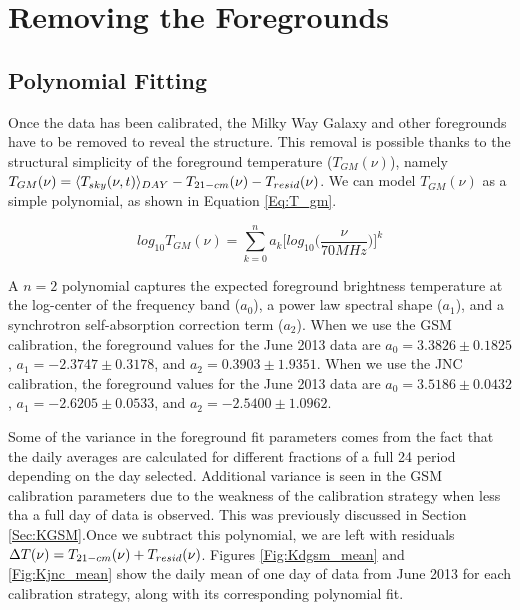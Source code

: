\section{Removing the Foregrounds}\label{Sec:fore}


\subsection{Polynomial Fitting}

Once the data has been calibrated, the Milky Way Galaxy and other foregrounds have to be removed to reveal the \cm structure. This removal is possible thanks to the structural simplicity of the foreground temperature ($T_{GM}(\nu)$), namely $T_{GM}(\nu) = \langle T_{sky}(\nu,t) \rangle_{DAY} - T_{21-cm} (\nu) - T_{resid} (\nu)$. We can model $T_{GM} (\nu)$ as a simple polynomial, as shown in Equation \ref{Eq:T_gm}.

\begin{equation} \label{Eq:T_gm}
log_{10} T_{GM}(\nu) = \sum_{k=0}^n a_k \Big[ log_{10} \Big(\frac{\nu}{70 MHz}\Big) \Big]^k
\end{equation}

A $n=2$ polynomial captures the expected foreground brightness temperature at the log-center of the frequency band ($a_0$), a power law spectral shape ($a_1$), and a synchrotron self-absorption correction term ($a_2$). When we use the GSM calibration, the foreground values for the June 2013 data are $a_0 = 3.3826 \pm 0.1825$, $a_1 = -2.3747 \pm 0.3178$, and $a_2 = 0.3903 \pm 1.9351$. When we use the JNC calibration, the foreground values for the June 2013 data are $a_0 = 3.5186 \pm 0.0432$, $a_1 = -2.6205 \pm 0.0533$, and $a_2 = -2.5400 \pm 1.0962$. 

Some of the variance in the foreground fit parameters comes from the fact that the daily averages are calculated for different fractions of a full 24 period depending on the day selected. Additional variance is seen in the GSM calibration parameters due to the weakness of the calibration strategy when less tha a full day of data is observed. This was previously discussed in Section \ref{Sec:KGSM}.Once we subtract this polynomial, we are left with residuals $\Delta T (\nu) = T_{21-cm}(\nu)+T_{resid}(\nu)$. Figures \ref{Fig:Kdgsm_mean} and \ref{Fig:Kjnc_mean} show the daily mean of one day of data from June 2013 for each calibration strategy, along with its corresponding polynomial fit. 

